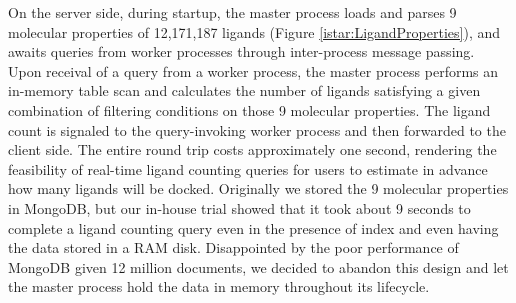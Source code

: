 On the server side, during startup, the master process loads and parses 9 molecular properties of 12,171,187 ligands (Figure \ref{istar:LigandProperties}), and awaits queries from worker processes through inter-process message passing. Upon receival of a query from a worker process, the master process performs an in-memory table scan and calculates the number of ligands satisfying a given combination of filtering conditions on those 9 molecular properties. The ligand count is signaled to the query-invoking worker process and then forwarded to the client side. The entire round trip costs approximately one second, rendering the feasibility of real-time ligand counting queries for users to estimate in advance how many ligands will be docked. Originally we stored the 9 molecular properties in MongoDB, but our in-house trial showed that it took about 9 seconds to complete a ligand counting query even in the presence of index and even having the data stored in a RAM disk. Disappointed by the poor performance of MongoDB given 12 million documents, we decided to abandon this design and let the master process hold the data in memory throughout its lifecycle.

